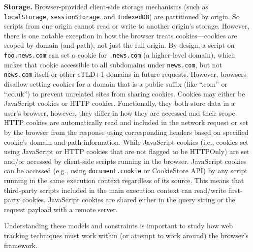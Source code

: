\noindent \textbf{Storage.} 
%
Browser-provided client-side storage mechanisms (such as \texttt{localStorage}, \texttt{sessionStorage}, and \texttt{IndexedDB}) are partitioned by origin.
%
So scripts from one origin cannot read or write to another origin’s storage. 
%
However, there is one notable exception in how the browser treats cookies---cookies are scoped by domain (and path), not just the full origin. 
%
By design, a script on \texttt{foo.news.com} can set a cookie for \texttt{.news.com} (a higher-level domain), which makes that cookie accessible to all subdomains under \texttt{news.com}, but not \texttt{news.com} itself or other eTLD+1 domains in future requests. 
%
However, browsers disallow setting cookies for a domain that is a public suffix (like ``.com'' or ``.co.uk'') to prevent unrelated sites from sharing cookies.
%
Cookies may either be JavaScript cookies or HTTP cookies. 
%
Functionally, they both store data in a user's browser, however, they differ in how they are accessed and their scope.
%
HTTP cookies are automatically read and included in the network request or set by the browser from the response using corresponding headers based on specified cookie's domain and path information.
%
While JavaScript cookies (i.e., cookies set using JavaScript or HTTP cookies that are not flagged to be HTTPOnly) are set and/or accessed by client-side scripts running in the browser. 
%
JavaScript cookies can be accessed (e.g., using \texttt{document.cookie} or CookieStore API) by any script running in the same execution context regardless of its source. 
%
This means that third-party scripts included in the main execution context can read/write first-party cookies. 
%
JavaScript cookies are shared either in the query string or the request payload with a remote server.


Understanding these models and constraints is important to study how web tracking techniques must work within (or attempt to work around) the browser’s framework.